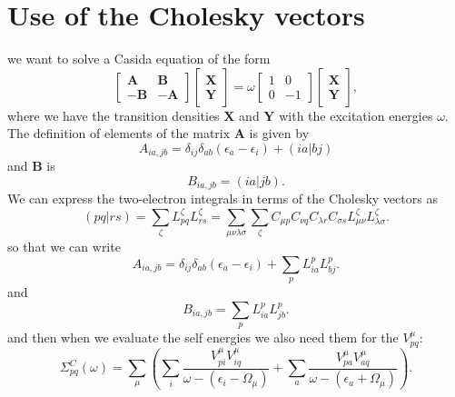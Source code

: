 \documentclass[12pt]{article}
\begin{document}
\section{Use of the Cholesky vectors}
we want to solve a Casida equation of the form
\begin{equation}
\begin{bmatrix}
\textbf{A} & \textbf{B} \\
-\textbf{B} & -\textbf{A}
\end{bmatrix}
\begin{bmatrix}
\textbf{X} \\
\textbf{Y}
\end{bmatrix}
=
\omega
\begin{bmatrix}
1 & 0 \\
0 & -1
\end{bmatrix}
\begin{bmatrix}
\textbf{X} \\
\textbf{Y}
\end{bmatrix},
\end{equation}
where we have the transition densities $\textbf{X}$ and $\textbf{Y}$ with the excitation energies $\omega$. The definition of elements of the matrix $\textbf{A}$ is given by
\begin{equation}
    A_{ia,jb} = \delta _{ij}\delta _{ab}(\epsilon _{a}- \epsilon _{i}) + (ia|bj)
\end{equation}
and $\textbf{B}$ is
\begin{equation}
    B_{ia,jb} = (ia|jb).
\end{equation}
We can express the two-electron integrals in terms of the Cholesky vectors as
\begin{equation}
    (pq|rs) = \sum _{\zeta} L_{pq}^{\zeta} L_{rs}^{\zeta} = \sum _{\mu \nu \lambda \sigma} \sum_{\zeta} C_{\mu p} C_{\nu q} C_{\lambda r} C_{\sigma s} L_{\mu \nu}^{\zeta} L_{\lambda \sigma}^{\zeta}.
\end{equation}
so that we can write
\begin{equation}
    A_{ia,jb} = \delta _{ij}\delta _{ab}\left( \epsilon _a - \epsilon _i \right) + \sum _{p} L_{ia}^p L_{bj}^p.
\end{equation}
and
\begin{equation}
    B_{ia,jb} = \sum _{p} L_{ia}^p L_{jb}^p.
\end{equation}
and then when we evaluate the self energies we also need them for the $V_{pq}^{\mu}$:
\begin{equation}
    \Sigma_{pq}^C(\omega) = \sum _{\mu} \left( \sum _i \frac{V_{pi}^{\mu}V_{iq}^{\mu}}{\omega - (\epsilon_i - \Omega_{\mu})} + \sum _a \frac{V_{pa}^{\mu}V_{aq}^{\mu}}{\omega - (\epsilon_a + \Omega_{\mu})} \right).
\end{equation}
\end{document}
